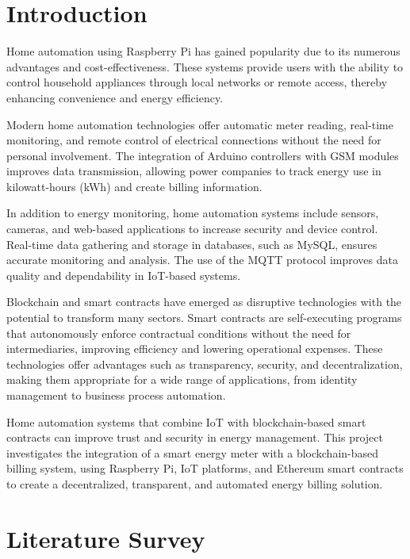 \documentclass[a4paper,12pt]{report}
\begin{document}
\tableofcontents
\listoftables
\listoffigures
\newpage

\chapter{Introduction}
Home automation using Raspberry Pi has gained popularity due to its numerous advantages and cost-effectiveness. These systems provide users with the ability to control household appliances through local networks or remote access, thereby enhancing convenience and energy efficiency\cite{jain2014raspberry}. 

Modern home automation technologies offer automatic meter reading, real-time monitoring, and remote control of electrical connections without the need for personal involvement\cite{chaudhari2017smart}.  The integration of Arduino controllers with GSM modules improves data transmission, allowing power companies to track energy use in kilowatt-hours (kWh) and create billing information\cite{rahman2015arduino}.

In addition to energy monitoring, home automation systems include sensors, cameras, and web-based applications to increase security and device control\cite{patchava2015smart}.  Real-time data gathering and storage in databases, such as MySQL, ensures accurate monitoring and analysis.  The use of the MQTT protocol improves data quality and dependability in IoT-based systems\cite{Atmoko_2017}.

Blockchain and smart contracts have emerged as disruptive technologies with the potential to transform many sectors.  Smart contracts are self-executing programs that autonomously enforce contractual conditions without the need for intermediaries, improving efficiency and lowering operational expenses\cite{10.1145/3328833.3328857}.  These technologies offer advantages such as transparency, security, and decentralization, making them appropriate for a wide range of applications, from identity management to business process automation\cite{chaudhari2017smart}.

Home automation systems that combine IoT with blockchain-based smart contracts can improve trust and security in energy management.  This project investigates the integration of a smart energy meter with a blockchain-based billing system, using Raspberry Pi, IoT platforms, and Ethereum smart contracts to create a decentralized, transparent, and automated energy billing solution.

\chapter{Literature Survey}
\end{document}
